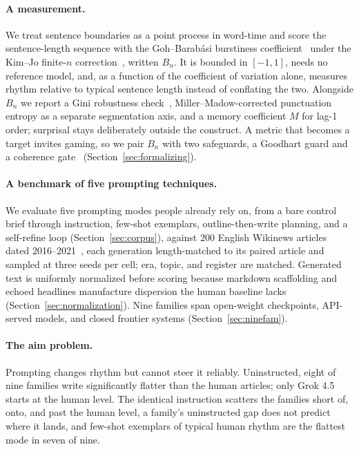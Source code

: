 \documentclass{article}
\begin{document}
\paragraph{A measurement.}
We treat sentence boundaries as a point process in word-time and score
the sentence-length sequence with the Goh--Barab\'asi burstiness
coefficient~\citep{goh2008burstiness} under the Kim--Jo finite-$n$
correction~\citep{kim2016measuring}, written $B_n$. It is bounded in
$[-1, 1]$, needs no reference model, and, as a function of the
coefficient of variation alone, measures rhythm relative to typical
sentence length instead of conflating the two.
Alongside $B_n$ we report a Gini robustness
check~\citep{gini1912variabilit}, Miller--Madow-corrected punctuation
entropy as a separate segmentation axis, and a memory coefficient $M$
for lag-1 order; surprisal stays deliberately outside the construct.
A metric that becomes a target invites gaming, so we pair $B_n$
with two safeguards, a Goodhart guard and a coherence
gate~\citep{arxiv2025evaluating} (Section~\ref{sec:formalizing}).

\paragraph{A benchmark of five prompting techniques.}
We evaluate five prompting modes people already rely on, from a bare
control brief through instruction, few-shot exemplars, outline-then-write
planning, and a self-refine loop (Section~\ref{sec:corpus}), against
$200$ English Wikinews articles dated 2016--2021~\citep{wikinews2021wikinews},
each generation length-matched to its paired article and sampled at
three seeds per cell; era, topic, and register are matched. Generated text is uniformly normalized before
scoring because markdown scaffolding and echoed headlines manufacture
dispersion the human baseline lacks (Section~\ref{sec:normalization}). Nine families span
open-weight checkpoints, API-served models, and closed frontier systems
(Section~\ref{sec:ninefam}).

\paragraph{The aim problem.}
Prompting changes rhythm but cannot steer it reliably. Uninstructed,
eight of nine families write significantly flatter than the human
articles; only Grok 4.5 starts at the human level. The identical
instruction scatters the families short of, onto, and past the human
level, a family's uninstructed gap does not predict where it lands, and
few-shot exemplars of typical human rhythm are the flattest mode in
seven of nine.
\end{document}
